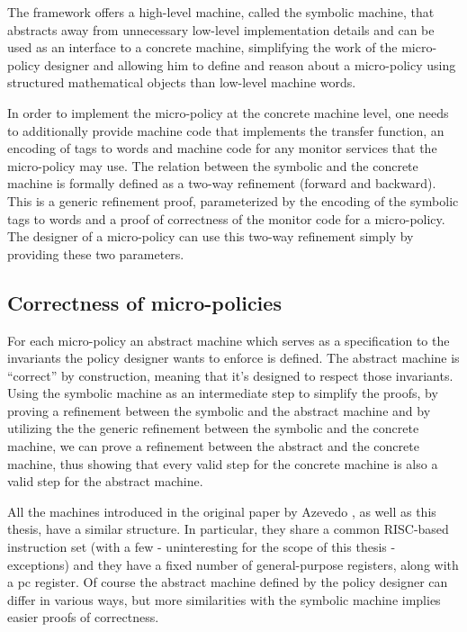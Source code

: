 The framework offers a high-level machine, called the symbolic
machine, that abstracts away from unnecessary low-level implementation
details and can be used as an interface to a concrete machine,
simplifying the work of the micro-policy designer and allowing him to
define and reason about a micro-policy using structured mathematical
objects than low-level machine words.

In order to implement the micro-policy at the concrete machine level, one needs
to additionally provide machine code that implements the transfer function, an
encoding of tags to words and machine code for any monitor services that the
micro-policy may use. The relation between the symbolic and the concrete machine
is formally defined as a two-way refinement (forward and backward). This is a
generic refinement proof, parameterized by the encoding of the symbolic tags to
words and a proof of correctness of the monitor code for a micro-policy.
The designer of a micro-policy can use this two-way refinement simply by
providing these two parameters.

\subsection{Correctness of micro-policies}\label{sec:verification}

For each micro-policy an abstract machine which serves as a
specification to the invariants the policy designer wants to enforce
is defined. The abstract machine is ``correct'' by construction,
meaning that it's designed to respect those invariants. Using the
symbolic machine as an intermediate step to simplify the proofs, by
proving a refinement between the symbolic and the abstract machine and
by utilizing the the generic refinement between the symbolic and the
concrete machine, we can prove a refinement between the abstract and
the concrete machine, thus showing that every valid step for the
concrete machine is also a valid step for the abstract machine.

All the machines introduced in the original paper by Azevedo \ETAL
\cite{pump_popl2015}, as well as this thesis, have a similar
structure. In particular, they share a common RISC-based instruction
set (with a few - uninteresting for the scope of this thesis -
exceptions) and they have a fixed number of general-purpose registers,
along with a pc register. Of course the abstract machine defined by
the policy designer can differ in various ways, but more similarities
with the symbolic machine implies easier proofs of correctness.

